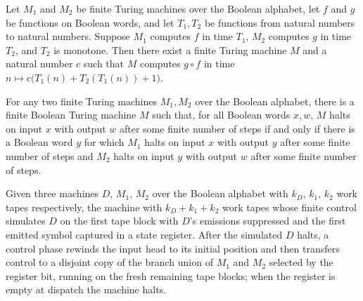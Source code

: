 \begin{theorem}
\label{Turing.FinTM.computesFunInTime_comp}
\leanok
{}
Let $M_1$ and $M_2$ be finite Turing machines over the Boolean alphabet, let $f$ and $g$
be functions on Boolean words, and let $T_1,T_2$ be functions from natural numbers to
natural numbers. Suppose $M_1$ computes $f$ in time $T_1$, $M_2$ computes $g$ in time
$T_2$, and $T_2$ is monotone. Then there exist a finite Turing machine $M$ and a natural
number $c$ such that $M$ computes $g\circ f$ in time $n\mapsto
c\bigl(T_1(n)+T_2(T_1(n))+1\bigr)$.
\end{theorem}

\begin{theorem}
\label{Turing.FinTM.exists_comp_partial}
\leanok
{}
For any two finite Turing machines $M_1,M_2$ over the Boolean alphabet, there is a
finite Boolean Turing machine $M$ such that, for all Boolean words $x,w$, $M$ halts on
input $x$ with output $w$ after some finite number of steps if and only if there is a
Boolean word $y$ for which $M_1$ halts on input $x$ with output $y$ after some finite
number of steps and $M_2$ halts on input $y$ with output $w$ after some finite number of
steps.
\end{theorem}

\begin{definition}
\label{Turing.FinTM.condTM}
\leanok
{}
Given three machines $D$, $M_1$, $M_2$ over the Boolean alphabet with $k_D$,
$k_1$, $k_2$ work tapes respectively, the machine with $k_D + k_1 + k_2$ work
tapes whose finite control simulates $D$ on the first tape block with $D$'s
emissions suppressed and the first emitted symbol captured in a state
register.  After the simulated $D$ halts, a control phase rewinds the input
head to its initial position and then transfers control to a disjoint copy of
the branch union of $M_1$ and $M_2$ selected by the register bit, running on
the fresh remaining tape blocks; when the register is empty at dispatch the
machine halts.
\end{definition}

